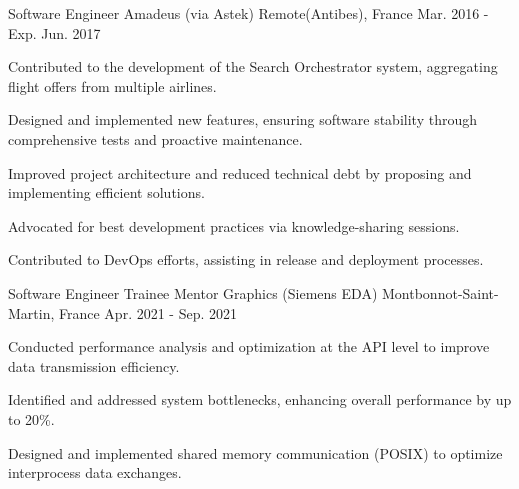 
  \cventry
    {Software Engineer} %
    {Amadeus (via Astek)} %
    {Remote(Antibes), France} %
    {Mar. 2016 - Exp. Jun. 2017} %
    {
      \begin{cvitems} %
        \item {Contributed to the development of the Search Orchestrator system, aggregating flight offers from multiple airlines.}
        \item {Designed and implemented new features, ensuring software stability through comprehensive tests and proactive maintenance.}
        \item {Improved project architecture and reduced technical debt by proposing and implementing efficient solutions.}
        \item {Advocated for best development practices via knowledge-sharing sessions.}
        \item {Contributed to DevOps efforts, assisting in release and deployment processes.}
      \end{cvitems}
    }

  \cventry
    {Software Engineer Trainee} %
    {Mentor Graphics (Siemens EDA)} %
    {Montbonnot-Saint-Martin, France} %
    {Apr. 2021 - Sep. 2021} %
    {
      \begin{cvitems} %
        \item {Conducted performance analysis and optimization at the API level to improve data transmission efficiency.}
        \item {Identified and addressed system bottlenecks, enhancing overall performance by up to 20\%.}
        \item {Designed and implemented shared memory communication (POSIX) to optimize interprocess data exchanges.}
      \end{cvitems}
    }

